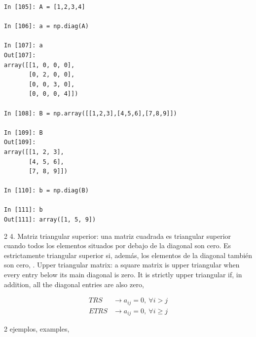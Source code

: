 \begin{center}	
	\begin{minipage}{0.9\textwidth}
		\begin{verbatim}
In [105]: A = [1,2,3,4]

In [106]: a = np.diag(A)

In [107]: a
Out[107]: 
array([[1, 0, 0, 0],
       [0, 2, 0, 0],
       [0, 0, 3, 0],
       [0, 0, 0, 4]])

In [108]: B = np.array([[1,2,3],[4,5,6],[7,8,9]])

In [109]: B
Out[109]: 
array([[1, 2, 3],
       [4, 5, 6],
       [7, 8, 9]])

In [110]: b = np.diag(B)

In [111]: b
Out[111]: array([1, 5, 9])
		\end{verbatim}
	\end{minipage}
\end{center}

\begin{paracol}{2}
4. Matriz triangular superior: una matriz cuadrada es triangular superior cuando todos los elementos situados por debajo de la diagonal son cero. Es estrictamente triangular superior si, además, los elementos de la diagonal también son cero,
. Upper triangular matrix: a square matrix is upper triangular when every entry below its main diagonal is zero. It is strictly upper triangular if, in addition, all the diagonal entries are also zero,   
\end{paracol}
\begin{align*}
TRS& \rightarrow a_{ij} = 0, \ \forall i > j \\
ETRS& \rightarrow a_{ij} = 0, \ \forall i\geq j 
\end{align*}
\begin{paracol}{2}
ejemplos,
\switchcolumn
examples,
\end{paracol}

